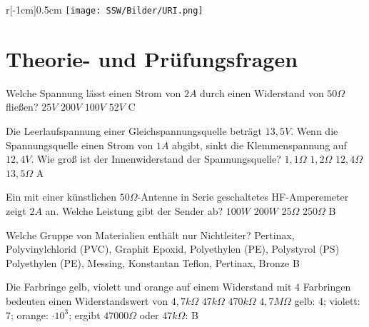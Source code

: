 

\begin{wrapfigure}[0]{r}[-1cm]{0.5cm}
 \vspace{-7cm}
  \texttt{[image: SSW/Bilder/URI.png]}
 \vspace{-6cm}
\end{wrapfigure}

\section*{Theorie- und Prüfungsfragen}





{Welche Spannung lässt einen Strom von $2A$ durch einen Widerstand von $50\Omega$ fließen?}%
{$25V$}%
{$200V$}%
{$100V$}%
{$52V$}%
{C}%

{Die Leerlaufspannung einer Gleichspannungsquelle beträgt $13,5V$. Wenn die Spannungsquelle einen Strom von $1A$ abgibt, sinkt die Klemmenspannung auf $12,4V$. Wie groß ist der Innenwiderstand der Spannungsquelle?}%
{$1,1\Omega$}%
{$1,2\Omega$}%
{$12,4\Omega$}%
{$13,5\Omega$}%
{A}%

{Ein mit einer künstlichen $50\Omega$-Antenne in Serie geschaltetes HF-Amperemeter zeigt $2A$ an. Welche Leistung gibt der Sender ab?}%
{$100W$}%
{$200W$}%
{$25\Omega$}%
{$250\Omega$}%
{B}%

{Welche Gruppe von Materialien enthält nur Nichtleiter?}%
{Pertinax, Polyvinylchlorid (PVC), Graphit}%
{Epoxid, Polyethylen (PE), Polystyrol (PS)}%
{Polyethylen (PE), Messing, Konstantan}%
{Teflon, Pertinax, Bronze}%
{B}%


{Die Farbringe gelb, violett und orange auf einem Widerstand mit 4 Farbringen bedeuten einen Widerstandswert von}%
{$4,7k\Omega$}%
{$47k\Omega$}%
{$470k\Omega$}%
{$4,7M\Omega$}%
{gelb: 4; violett: 7; orange: $\cdot 10^3$; ergibt $47000\Omega$ oder $47k\Omega$: B}%

